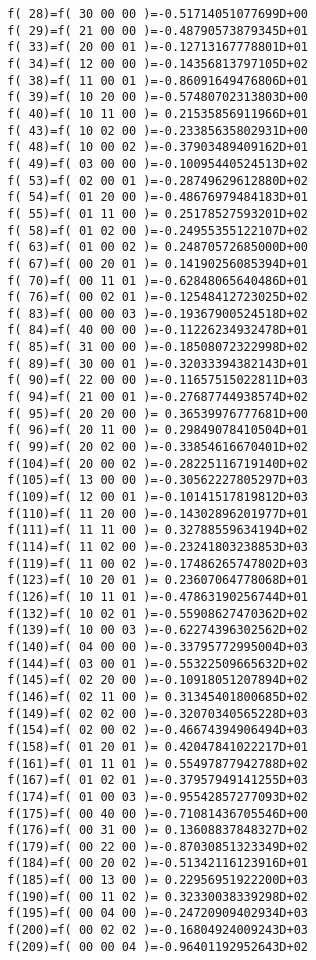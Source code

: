 {\begin{verbatim}
  f( 28)=f( 30 00 00 )=-0.51714051077699D+00
  f( 29)=f( 21 00 00 )=-0.48790573879345D+01
  f( 33)=f( 20 00 01 )=-0.12713167778801D+01
  f( 34)=f( 12 00 00 )=-0.14356813797105D+02
  f( 38)=f( 11 00 01 )=-0.86091649476806D+01
  f( 39)=f( 10 20 00 )=-0.57480702313803D+00
  f( 40)=f( 10 11 00 )= 0.21535856911966D+01
  f( 43)=f( 10 02 00 )=-0.23385635802931D+00
  f( 48)=f( 10 00 02 )=-0.37903489409162D+01
  f( 49)=f( 03 00 00 )=-0.10095440524513D+02
  f( 53)=f( 02 00 01 )=-0.28749629612880D+02
  f( 54)=f( 01 20 00 )=-0.48676979484183D+01
  f( 55)=f( 01 11 00 )= 0.25178527593201D+02
  f( 58)=f( 01 02 00 )=-0.24955355122107D+02
  f( 63)=f( 01 00 02 )= 0.24870572685000D+00
  f( 67)=f( 00 20 01 )= 0.14190256085394D+01
  f( 70)=f( 00 11 01 )=-0.62848065640486D+01
  f( 76)=f( 00 02 01 )=-0.12548412723025D+02
  f( 83)=f( 00 00 03 )=-0.19367900524518D+02
  f( 84)=f( 40 00 00 )=-0.11226234932478D+01
  f( 85)=f( 31 00 00 )=-0.18508072322998D+02
  f( 89)=f( 30 00 01 )=-0.32033394382143D+01
  f( 90)=f( 22 00 00 )=-0.11657515022811D+03
  f( 94)=f( 21 00 01 )=-0.27687744938574D+02
  f( 95)=f( 20 20 00 )= 0.36539976777681D+00
  f( 96)=f( 20 11 00 )= 0.29849078410504D+01
  f( 99)=f( 20 02 00 )=-0.33854616670401D+02
  f(104)=f( 20 00 02 )=-0.28225116719140D+02
  f(105)=f( 13 00 00 )=-0.30562227805297D+03
  f(109)=f( 12 00 01 )=-0.10141517819812D+03
  f(110)=f( 11 20 00 )=-0.14302896201977D+01
  f(111)=f( 11 11 00 )= 0.32788559634194D+02
  f(114)=f( 11 02 00 )=-0.23241803238853D+03
  f(119)=f( 11 00 02 )=-0.17486265747802D+03
  f(123)=f( 10 20 01 )= 0.23607064778068D+01
  f(126)=f( 10 11 01 )=-0.47863190256744D+01
  f(132)=f( 10 02 01 )=-0.55908627470362D+02
  f(139)=f( 10 00 03 )=-0.62274396302562D+02
  f(140)=f( 04 00 00 )=-0.33795772995004D+03
  f(144)=f( 03 00 01 )=-0.55322509665632D+02
  f(145)=f( 02 20 00 )=-0.10918051207894D+02
  f(146)=f( 02 11 00 )= 0.31345401800685D+02
  f(149)=f( 02 02 00 )=-0.32070340565228D+03
  f(154)=f( 02 00 02 )=-0.46674394906494D+03
  f(158)=f( 01 20 01 )= 0.42047841022217D+01
  f(161)=f( 01 11 01 )= 0.55497877942788D+02
  f(167)=f( 01 02 01 )=-0.37957949141255D+03
  f(174)=f( 01 00 03 )=-0.95542857277093D+02
  f(175)=f( 00 40 00 )=-0.71081436705546D+00
  f(176)=f( 00 31 00 )= 0.13608837848327D+02
  f(179)=f( 00 22 00 )=-0.87030851323349D+02
  f(184)=f( 00 20 02 )=-0.51342116123916D+01
  f(185)=f( 00 13 00 )= 0.22956951922200D+03
  f(190)=f( 00 11 02 )= 0.32330038339298D+02
  f(195)=f( 00 04 00 )=-0.24720909402934D+03
  f(200)=f( 00 02 02 )=-0.16804924009243D+03
  f(209)=f( 00 00 04 )=-0.96401192952643D+02
\end{verbatim}}

